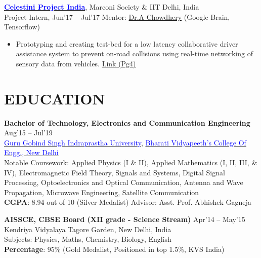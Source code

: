 \documentclass[11pt]{res} %
\newcommand{\titlegap}{5pt} %
\newcommand{\sectgap}{0.05in} %
\begin{document}
\begin{resume}
\href{https://www.marconisociety.org/programs-services/}{\textbf{\textcolor{blue}{Celestini Project India}}}, Marconi Society \& IIT Delhi, India\\
Project Intern, Jun'17 – Jul'17 \hfill Mentor: \href{https://achowdhery.github.io/achowdhery-website/index.html}{Dr.A Chowdhery} (Google Brain, Tensorflow)
\begin{itemize}
\item Prototyping and creating test-bed for a low latency collaborative driver assistance system to prevent on-road collisions using real-time networking of sensory data from vehicles. \textcolor{blue}{\href{https://bhartischool.iitd.ac.in/pdf/7thISSUEnewsletter.pdf}{Link (Pg4)}}
\end{itemize}


\vspace{\sectgap}
\hline
\section{EDUCATION} %

\vspace{\titlegap}

{\bf Bachelor of Technology, Electronics and Communication Engineering} \hfill Aug'15 -- Jul'19 \\ 
\href{http://www.ipu.ac.in/}{\textcolor{blue}{Guru Gobind Singh Indraprastha University}}, \href{http://bvcoend.ac.in}{\textcolor{blue}{Bharati Vidyapeeth's College Of Engg., New Delhi}}\\
Notable Coursework: Applied Physics (I \& II), Applied Mathematics (I, II, III, \& IV), Electromagnetic Field Theory, Signals and Systems, Digital Signal Processing, Optoelectronics and Optical Communication, Antenna and Wave Propagation, Microwave Engineering, Satellite Communication \\
\textbf{CGPA}: 8.94 out of 10 (Silver Medalist) \hspace{0.2in}
\hfill Advisor: Asst. Prof. Abhishek Gagneja

{\bf AISSCE, CBSE Board (XII grade - Science Stream)} \hfill Apr'14 -- May'15 \\ 
Kendriya Vidyalaya Tagore Garden, New Delhi, India\\ 
Subjects: Physics, Maths, Chemistry, Biology, English\\
\textbf{Percentage}: 95\% (Gold Medalist, Positioned in top 1.5\%, KVS India)


\end{resume}
\end{document}
